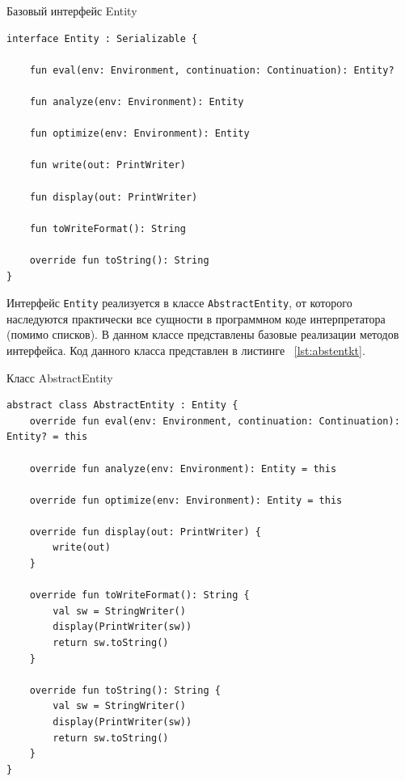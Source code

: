 \documentclass[14pt, russian]{scrartcl}
\begin{document}
\begin{listing}[!htb]
\caption{Базовый интерфейс Entity}
\label{lst:entitykt}
\begin{verbatim}
interface Entity : Serializable {

    fun eval(env: Environment, continuation: Continuation): Entity?

    fun analyze(env: Environment): Entity

    fun optimize(env: Environment): Entity

    fun write(out: PrintWriter)

    fun display(out: PrintWriter)

    fun toWriteFormat(): String

    override fun toString(): String
}
\end{verbatim}
\end{listing}

Интерфейс \texttt{Entity} реализуется в классе \texttt{AbstractEntity}, от которого наследуются практически все сущности в программном коде интерпретатора (помимо списков). В данном классе представлены базовые реализации методов интерфейса. Код данного класса представлен в листинге ~\ref{lst:abstentkt}.

\begin{listing}[!htb]
\caption{Класс AbstractEntity}
\label{lst:abstentkt}
\begin{verbatim}
abstract class AbstractEntity : Entity {
    override fun eval(env: Environment, continuation: Continuation): Entity? = this

    override fun analyze(env: Environment): Entity = this

    override fun optimize(env: Environment): Entity = this

    override fun display(out: PrintWriter) {
        write(out)
    }

    override fun toWriteFormat(): String {
        val sw = StringWriter()
        display(PrintWriter(sw))
        return sw.toString()
    }

    override fun toString(): String {
        val sw = StringWriter()
        display(PrintWriter(sw))
        return sw.toString()
    }
}

\end{verbatim}
\end{listing}
\end{document}
